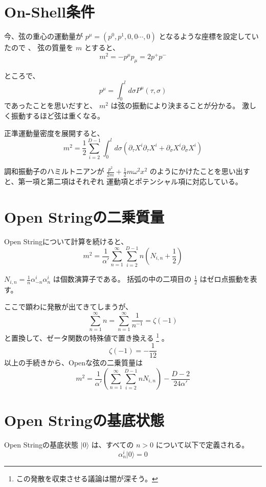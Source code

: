 \documentclass[uplatex]{jsarticle}
\begin{document}
\section{On-Shell条件}

今、弦の重心の運動量が
$p^{\mu} = (p^{0} , p^{1}, 0 , 0 \cdots, 0)$
となるような座標を設定していたので
、
弦の質量を
$m$
とすると、
$$
	m^{2}
	=
	- p^{\mu} p_{\mu}
	=
	2 p^{+} p^{-}
$$

ところで、
$$
	p^{\mu}
	=
	\int^{l}_{0} d \sigma
	P^{\mu}(\tau, \sigma)
$$
であったことを思いだすと、
$m^{2}$
は弦の振動により決まることが分かる。
激しく振動するほど弦は重くなる。

正準運動量密度を展開すると、
$$
	m^{2}
	=
	\frac{1}{2}
	\sum^{D-1}_{i=2}
	\int^{l}_{0} d \sigma
	\left(
	\partial_{\tau} X^{i} \partial_{\tau} X^{i}
	+
	\partial_{\sigma} X^{i} \partial_{\sigma} X^{i}
	\right)
$$

調和振動子のハミルトニアンが
$
	\frac{p^{2}}{2m}
	+
	\frac{1}{2} m \omega^{2} x^{2}
$
のようにかけたことを思い出すと、第一項と第二項はそれぞれ
運動項とポテンシャル項に対応している。

\section{Open Stringの二乗質量}

Open Stringについて計算を続けると、
$$
	m^{2}
	=
	\frac{1}{\alpha'}
	\sum^{\infty}_{n=1}
	\sum^{D-1}_{i=2}
	n
	\left(
	N_{i,n} + \frac{1}{2}
	\right)
$$

$N_{i,n}=\frac{1}{n} \alpha^{i}_{-n} \alpha^{i}_{n}$
は個数演算子である。
括弧の中の二項目の
$\frac{1}{2}$
はゼロ点振動を表す。

ここで顕わに発散が出てきてしまうが、
$$
	\sum^{\infty}_{n=1} n
	=
	\sum^{\infty}_{n=1}
	\frac{1}{n^{-1}}
	=
	\zeta(-1)
$$
と置換して、ゼータ関数の特殊値で置き換える
\footnote{この発散を収束させる議論は闇が深そう。}
。
$$
	\zeta(-1)
	=
	- \frac{1}{12}
$$
以上の手続きから、Openな弦の二乗質量は
$$
	m^{2}
	=
	\frac{1}{\alpha'}
	\left(
	\sum^{\infty}_{n=1}
	\sum^{D-1}_{i=2}
	n N_{i,n}
	\right)
	- \frac{D-2}{24 \alpha'}
$$

\section{Open Stringの基底状態}

Open Stringの基底状態
$| 0 \rangle$
は、すべての
$n>0$
について以下で定義される。
$$
	\alpha^{i}_{n}
	| 0 \rangle
	= 0
$$
\end{document}
